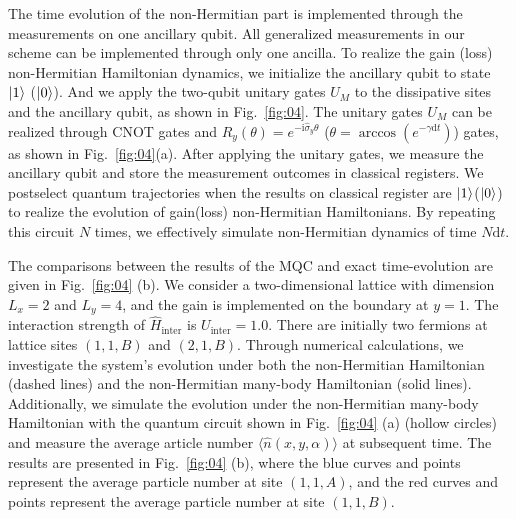 \documentclass[longbibliography, aps, prx, amsmath, amssymb, amsfonts, twocolumn,superscriptaddress, footinbib]{revtex4-1}
\begin{document}
	The time evolution of the non-Hermitian part is implemented through the measurements on one ancillary qubit. 
	All generalized measurements in our scheme can be implemented through only one ancilla. To realize the gain (loss) non-Hermitian Hamiltonian dynamics, we initialize the ancillary qubit to state $\ket{1}$ ($\ket{0}$). And we apply the two-qubit unitary gates $U_M$ to the dissipative sites and the ancillary qubit, as shown in Fig.~\ref{fig:04}. The unitary gates $U_M$ can be realized through CNOT gates and $R_y(\theta) = e^{-\mathrm{i} \hat{\sigma}_y \theta}$ ($\theta = \arccos(e^{-\gamma \mathrm{d}t})$) gates, as shown in Fig.~\ref{fig:04}(a). 
	After applying the unitary gates, we measure the ancillary qubit and store the measurement outcomes in classical registers. 
	We postselect quantum trajectories when the results on classical register are $\ket{1}$($\ket{0}$) to realize the evolution of gain(loss) non-Hermitian Hamiltonians. By repeating this circuit $N$ times, we effectively simulate non-Hermitian dynamics of time $N\mathrm{d}t$.

	The comparisons between the results of the MQC and exact time-evolution are given in Fig.~\ref{fig:04} (b). 
	We consider a two-dimensional lattice with dimension $L_x=2$ and $L_y=4$, and the gain is implemented on the boundary at $y=1$. The interaction strength of $\hat{H}_{\text{inter}}$ is $U_{\text{inter}}=1.0$.
	There are initially two fermions at lattice sites $(1,1,B)$ and $(2,1,B)$. Through numerical calculations, we investigate the system's evolution under both the non-Hermitian Hamiltonian (dashed lines) and the non-Hermitian many-body Hamiltonian (solid lines). Additionally, we simulate the evolution under the non-Hermitian many-body Hamiltonian with the quantum circuit shown in Fig.~\ref{fig:04} (a) (hollow circles) and measure the average article number $\langle \hat{n}(x,y,\alpha)\rangle$ at subsequent time. The results are presented in Fig.~\ref{fig:04} (b), where the blue curves and points represent the average particle number at site $(1,1,A)$, and the red curves and points represent the average particle number at site $(1,1,B)$.
\end{document}

